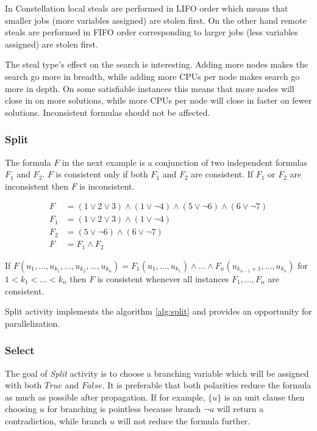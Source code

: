 In Constellation local steals are performed in LIFO order which means
that smaller jobs (more variables assigned) are stolen first. On
the other hand remote steals are performed in FIFO order corresponding
to larger jobs (less variables assigned) are stolen first.

The steal type's effect on the search is interesting. Adding
more nodes makes the search go more in breadth, while adding more
CPUs per node makes search go more in depth. On some satisfiable
instances this means that more nodes will close in on more solutions,
while more CPUs per node will close in faster on fewer solutions.
Inconsistent formulas should not be affected.

\subsubsection{Split}

The formula $F$ in the next example is a conjunction of two
independent formulas $F_1$ and $F_2$. $F$ is consistent only if both
$F_1$ and $F_2$ are consistent. If $F_1$ or $F_2$ are inconsistent
then $F$ is inconsistent.

\begin{align}
  F &= (1 \lor 2 \lor 3) \land (1 \lor \neg 4) \land (5 \lor \neg 6) \land (6 \lor \neg 7) \\
  F_1 &= (1 \lor 2 \lor 3) \land (1 \lor \neg 4) \\
  F_2 &= (5 \lor \neg 6) \land (6 \lor \neg 7) \\
  F &= F_1 \land F_2
\end{align}

\begin{myprop}
  If $F(u_1, \ldots, u_{k_1}, \ldots, u_{k_2}, \ldots, u_{k_n}) =
  F_1(u_1, \ldots, u_{k_1}) \land \ldots \land F_n(u_{k_{n-1}+1},
  \ldots, u_{k_n})$ for $1 < k_1 < \ldots <k_n$ then $F$
  is consistent whenever all instances $F_1, \ldots, F_n$
  are consistent.
\end{myprop}

Split activity implements the algorithm \ref{alg:split} and provides
an opportunity for parallelization.


\subsubsection{Select}
\label{ssec:branching}

The goal of \emph{Split} activity is to choose a branching variable
which will be assigned with both $True$ and $False$. It is preferable
that both polarities reduce the formula as much as possible after
propagation.  If for example, $\{ u \}$ is an unit clause then
choosing $u$ for branching is pointless because branch $\neg u$
will return a contradiction, while branch $u$ will not reduce the
formula further.

